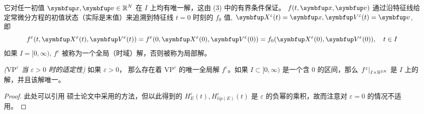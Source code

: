 \begin{definition}
\begin{enumerate}[(1)]
        它对任一初值 $\vx,\vv\in\bbR^N$ 在 $I$ 上均有唯一解，这由 (3) 中的有界条件保证。 $f(t,\vx, \vv)$ 通过沿特征线给定常微分方程的初值状态（实际是末值）来追溯到特征线 $t=0$ 时刻的 $f_0$ 值, $\vect{X}^\varepsilon(t)= \vx, \vect{V}^\varepsilon(t)= \vv$, 即
        \[
        f^{\varepsilon}(t, \vect{X}^\varepsilon(t), \vect{V}^\varepsilon(t))=f^{\varepsilon}(0, \vect{X}^\varepsilon(0), \vect{V}^\varepsilon(0))=f_{0}(\vect{X}^\varepsilon(0), \vect{V}^\varepsilon(0)), \quad t \in I
        \]
        如果 $I=[0, \infty)$, $f^{\varepsilon}$ 被称为一个全局（时域）解，否则被称为局部解。
    \end{enumerate}

\end{definition}






\begin{theorem}\textit{($\text{VP}^\varepsilon$ 当 $\varepsilon>0$ 时的适定性)}
\label{thm:epsilon-greater-0}
如果 $\varepsilon>0$， 那么存在着 $\text{VP}^{\varepsilon}$ 的唯一全局解 $f^\varepsilon$。如果 $I\subset[0, \infty)$ 是一个含 $0$ 的区间，那么 $\left.f^{\varepsilon}\right|_{I \times {\mathbb{R}}^{2N}}$ 是 $I$ 上的解，并且该解唯一。
\end{theorem} 
\begin{proof}
    此处可以引用 \cite*{Horst1975}  硕士论文中采用的方法，但以此得到的 $H_E^\varepsilon(t),H_{lip(E)}^\varepsilon(t)$ 是 $\varepsilon$ 的负幂的乘积，故而注意对 $\varepsilon=0$ 的情况不适用。
\end{proof}

